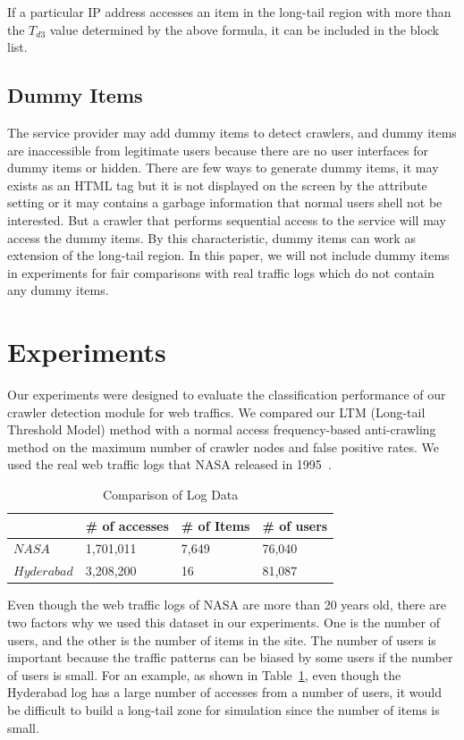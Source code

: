 \documentclass[sigconf,review]{acmart}
\begin{document}
If a particular IP address accesses an item in the long-tail region with more than the $T_{d3}$ value determined by the above formula, it can be included in the block list.


\subsection{Dummy Items}
The service provider may add dummy items to detect crawlers, and dummy items are inaccessible from legitimate users because there are no user interfaces for dummy items or hidden. There are few ways to generate dummy items, it may exists as an HTML tag but it is not displayed on the screen by the attribute setting or it may contains a garbage information that normal users shell not be interested. But a crawler that performs sequential access to the service will may access the dummy items. By this characteristic, dummy items can work as extension of the long-tail region. In this paper, we will not include dummy items in experiments for fair comparisons with real traffic logs which do not contain any dummy items.



%
%
\section{Experiments}
Our experiments were designed to evaluate the classification performance of our crawler detection module for web traffics. We compared our LTM (Long-tail Threshold Model) method with a normal access frequency-based anti-crawling method on the maximum number of crawler nodes and false positive rates. We used the real web traffic logs that NASA released in 1995~\cite{r15}. 

\begin{table}[H]
  \caption{Comparison of Log Data}
    \begin{tabular}{ l | l | l | l  }
    \hline
    & \# of accesses & \# of Items & \# of users \\ \hline
    $NASA$ & 1,701,011 & 7,649 & 76,040 \\ 
    $Hyderabad$ & 3,208,200 & 16 & 81,087  \\ \hline
    \end{tabular}
\label{tab:logdata}
\end{table}

Even though the web traffic logs of NASA are more than 20 years old, there are two factors why we used this dataset in our experiments. One is the number of users, and the other is the number of items in the site. The number of users is important because the traffic patterns can be biased by some users if the number of users is small. For an example,  as shown in Table~\ref{tab:logdata}, even though the Hyderabad log has a large number of accesses from a number of users, it would be difficult to build a long-tail zone for simulation since the number of items is small.
\end{document}
